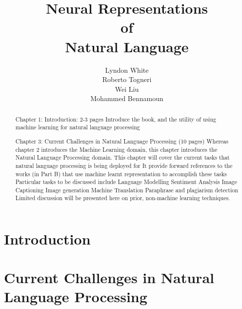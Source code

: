 \documentclass[12pt,parskip]{komatufte}
\begin{document}
\title{Neural Representations \\of\\ Natural Language}
\author{Lyndon White\\ Roberto Togneri\\ Wei Liu\\ Mohammed Bennamoun}
\publishers{SpringerBriefs in Computer Science}


\maketitle
\tableofcontents

\chapter{Introduction}\label{sec:introduction}
\begin{abstract}
	Chapter 1: Introduction: 2-3 pages
Introduce the book, and the utility of using machine learning for natural language processing
\end{abstract}






\chapter{Current Challenges in Natural Language Processing}\label{sec:current-challenges-in-natural-language-processing}
\begin{abstract}
	Chapter 3: Current Challenges in Natural Language Processing (10 pages)
	Whereas chapter 2 introduces the Machine Learning domain, this chapter introduces the Natural Language Processing domain.
	This chapter will cover the current tasks that natural language processing is being deployed for
	It provide forward references to the works (in Part B) that use machine learnt representation to accomplish these tasks
	Particular tasks to be discussed include
	Language Modelling
	Sentiment Analysis
	Image Captioning
	Image generation
	Machine Translation
	Paraphrase and plagiarism detection
	Limited discussion will be presented here on prior, non-machine learning techniques.
\end{abstract}
\end{document}
